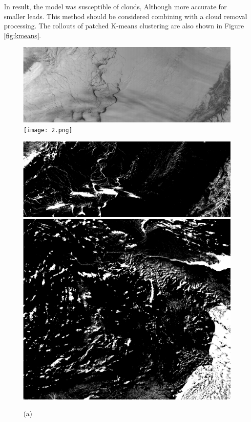 \documentclass{article}
\begin{document}
            In result, the model was susceptible of clouds,
            Although more accurate for smaller leads.
            This method should be considered combining
            with a cloud removal processing.
            The rollouts of patched K-means clustering are also
            shown in Figure \ref{fig:kmeans}.

        \begin{figure}[ht]
            \centering
            \begin{minipage}{0.32\hsize}
                \centering
                \includegraphics[width = 1\hsize]{1.png}
                \texttt{[image: 2.png]}
                \caption*{(a)}
            \end{minipage}
            \begin{minipage}{0.32\hsize}
                \centering
                \includegraphics[width = 1\hsize]{1_kmeans.png}
                \includegraphics[width = 1\hsize]{2_kmeans.png}

\end{minipage}
\end{figure}
\end{document}
